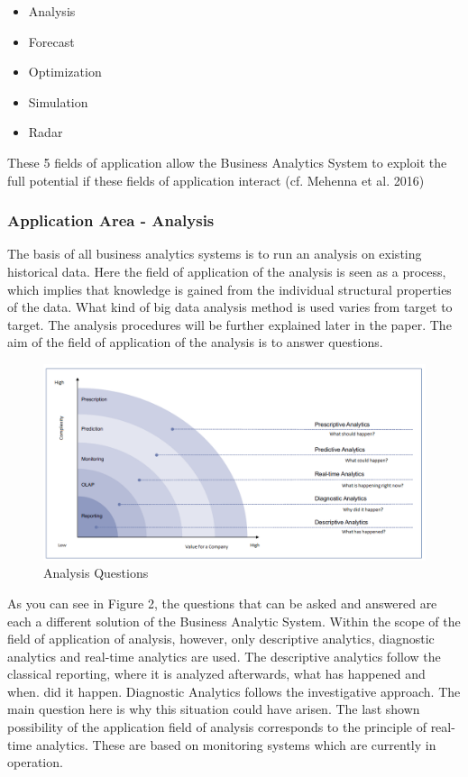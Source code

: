 \documentclass[12pt,twocolumn,twoside]{conference}   %
\begin{document}
\begin{itemize}
\item Analysis
\item Forecast
\item Optimization
\item Simulation
\item Radar
\end{itemize}

These 5 fields of application allow the Business Analytics System to exploit the full potential if these fields of application interact (cf. Mehenna et al. 2016) 

\subsubsection{Application Area - Analysis}
The basis of all business analytics systems is to run an analysis on existing historical data. Here the field of application of the analysis is seen as a process, which implies that knowledge is gained from the individual structural properties of the data. What kind of big data analysis method is used varies from target to target. The analysis procedures will be further explained later in the paper. The aim of the field of application of the analysis is to answer questions. 



\begin{figure}
\centering
\includegraphics[width=20cm]{Abbildungen/Analysis.png}
\caption{Analysis Questions}\label{visina8}
\end{figure}



As you can see in Figure 2, the questions that can be asked and answered are each a different solution of the Business Analytic System. Within the scope of the field of application of analysis, however, only descriptive analytics, diagnostic analytics and real-time analytics are used. The descriptive analytics follow the classical reporting, where it is analyzed afterwards, what has happened and when. did it happen. Diagnostic Analytics follows the investigative approach. The main question here is why this situation could have arisen. The last shown possibility of the application field of analysis corresponds to the principle of real-time analytics. These are based on monitoring systems which are currently in operation. 
\end{document}
